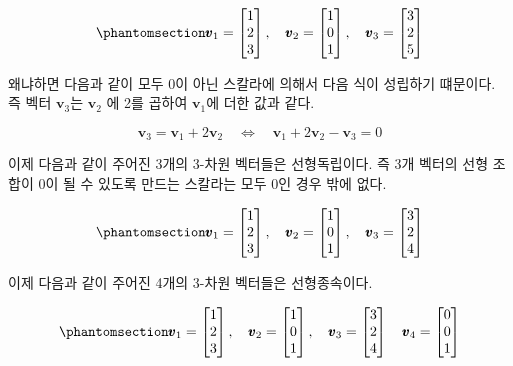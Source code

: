 \documentclass[
  11pt,
  a4paper,
  oneside]{scrbook}
\theoremstyle{definition}
\theoremstyle{plain}
\theoremstyle{definition}
\theoremstyle{definition}
\theoremstyle{remark}
\begin{document}
\begin{equation}\phantomsection\label{eq-vactors-lin-dep}{
\pmb v_1 =
\begin{bmatrix}
1\\
2\\
3
\end{bmatrix},
\quad
\pmb v_2 =
\begin{bmatrix}
1\\
0\\
1
\end{bmatrix},
\quad
\pmb v_3 =
\begin{bmatrix}
3\\
2\\
5
\end{bmatrix}
}\end{equation}

왜냐하면 다음과 같이 모두 0이 아닌 스칼라에 의해서 다음 식이 성립하기
떄문이다. 즉 벡터 \(\pmb v_3\)는 \(\pmb v_2\) 에 2를 곱하여
\(\pmb v_1\)에 더한 값과 같다.

\[ 
\pmb v_3 = \pmb v_1 + 2 \pmb v_2 \quad \Longleftrightarrow \quad    \pmb v_1 + 2 \pmb v_2 -\pmb v_3 = 0 
\]

이제 다음과 같이 주어진 3개의 3-차원 벡터들은 선형독립이다. 즉 3개
벡터의 선형 조합이 0이 될 수 있도록 만드는 스칼라는 모두 0인 경우 밖에
없다.

\begin{equation}\phantomsection\label{eq-vactors-lin-indep}{
\pmb v_1 =
\begin{bmatrix}
1\\
2\\
3
\end{bmatrix},
\quad
\pmb v_2 =
\begin{bmatrix}
1\\
0\\
1
\end{bmatrix},
\quad
\pmb v_3 =
\begin{bmatrix}
3\\
2\\
4
\end{bmatrix}
}\end{equation}

이제 다음과 같이 주어진 4개의 3-차원 벡터들은 선형종속이다.

\begin{equation}\phantomsection\label{eq-vactors-lin-dep-4}{
\pmb v_1 =
\begin{bmatrix}
1\\
2\\
3
\end{bmatrix},
\quad
\pmb v_2 =
\begin{bmatrix}
1\\
0\\
1
\end{bmatrix},
\quad
\pmb v_3 =
\begin{bmatrix}
3\\
2\\
4
\end{bmatrix}
\quad
\pmb v_4 =
\begin{bmatrix}
0\\
0\\
1
\end{bmatrix}
}\end{equation}
\end{document}
